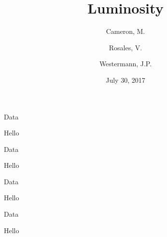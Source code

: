 \documentclass[12pt,fleqn,leqno,letterpaper]{article}
\title{Luminosity}
\author{
  Cameron, M.
  \and
  Rosales, V.
  \and
  Westermann, J.P.
}
\date{July 30, 2017}
\begin{document}
\maketitle

\newpage
\tableofcontents
\listoffigures
\listoftables

\newpage

\begin{section}{Data}
  \begin{subsection}{Hello}
  \end{subsection}
\end{section}

\begin{section}{Data}
  \begin{subsection}{Hello}
  \end{subsection}
\end{section}

\begin{section}{Data}
  \begin{subsection}{Hello}
  \end{subsection}
\end{section}

\begin{section}{Data}
  \begin{subsection}{Hello}
  \end{subsection}
\end{section}


\end{document}
